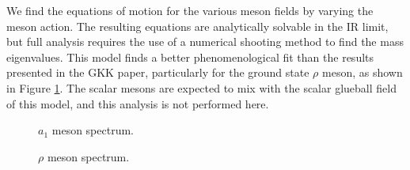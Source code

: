 We find the equations of motion for the various meson fields by varying the meson action.
The resulting equations are analytically solvable in the IR limit, but full analysis requires the use of a numerical shooting method to find the mass eigenvalues.
This model finds a better phenomenological fit than the results presented in the GKK paper, particularly for the ground state $\rho$ meson, as shown in Figure \ref{figRho}. 
The scalar mesons are expected to mix with the scalar glueball field of this model, and this analysis is not performed here. 

\begin{figure}[htb]
\caption{$a_1$ meson spectrum.}
\end{figure}

\begin{figure}[htb]
\caption{$\rho$ meson spectrum.}
\label{figRho}
\end{figure}

